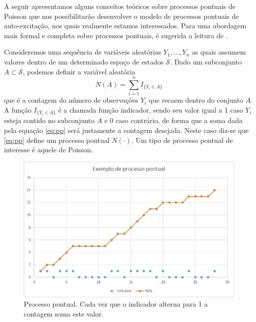\documentclass[review]{elsarticle}
\theoremstyle{definition}
\begin{document}
A seguir apresentamos alguns conceitos teóricos sobre processos pontuais de Poisson que nos possibilitarão desenvolver o modelo de processos pontuais de auto-excitação, nos quais realmente estamos interessados. Para uma abordagem mais formal e completa sobre processos pontuais, é sugerida a leitura de \cite{Daley2003,Daley2008}.

Consideremos uma sequência de variáveis aleatórias $Y_1, \ldots , Y_n$ as quais assumem valores dentro de um determinado espaço de estados $\mathcal{S}$. Dado um subconjunto $A\subset\mathcal{S}$, podemos definir a variável aleatória
\begin{equation}
\label{eq:pp}
N(A)=\sum_{i=1}^{n}I_{\{Y_i\in A\}}
\end{equation}
que é a contagem do número de observações $Y_i$ que recaem dentro do conjunto $A$. A função $I_{\{Y_i\in A\}}$ é a chamada função indicador, sendo seu valor igual a 1 caso $Y_i$ esteja contido no subconjunto $A$ e 0 caso contrário, de forma que a soma dada pela equação \eqref{eq:pp} será justamente a contagem desejada. Neste caso diz-se que \eqref{eq:pp} define um processo pontual $N(\cdot)$. Um tipo de processo pontual de interesse é aquele de Poisson.

\begin{figure}[ht]
	\centering
	\includegraphics[width=0.9\linewidth]{figs/figevtPP}
	\caption[Exemplo de processo pontual]{Processo pontual. Cada vez que o indicador alterna para 1 a contagem soma este valor.}
	\label{fig:figevtpp}
\end{figure}
\end{document}
